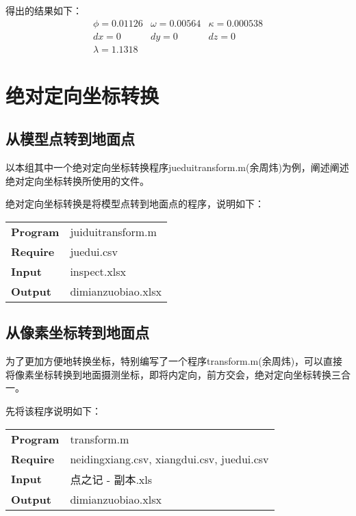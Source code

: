 得出的结果如下：
\begin{equation}
\begin{array}{lll}
\phi=0.01126 & \omega=0.00564 & \kappa=0.000538 \\
dx=0 & dy=0 & dz=0 \\
\lambda=1.1318 & &
\end{array}
\end{equation}

\section{绝对定向坐标转换}


\subsection{从模型点转到地面点}

以本组其中一个绝对定向坐标转换程序jueduitransform.m(余周炜)为例，阐述阐述绝对定向坐标转换所使用的文件。

绝对定向坐标转换是将模型点转到地面点的程序，说明如下：

\begin{table}[htbp]
  \begin{tabular}{p{10em}p{8cm}}
  \toprule
  \textbf{Program} & juiduitransform.m \\
  \textbf{Require} & juedui.csv \\
  \textbf{Input} & inspect.xlsx \\
  \textbf{Output} & dimianzuobiao.xlsx \\
  \bottomrule
  \end{tabular}
  \end{table}

\subsection{从像素坐标转到地面点}

为了更加方便地转换坐标，特别编写了一个程序transform.m(余周炜)，可以直接将像素坐标转换到地面摄测坐标，即将内定向，前方交会，绝对定向坐标转换三合一。

先将该程序说明如下：
\begin{table}[htbp]
\begin{tabular}{p{10em}p{8cm}}
\toprule
\textbf{Program} & transform.m \\
\textbf{Require} & neidingxiang.csv, xiangdui.csv, juedui.csv \\
\textbf{Input} & 点之记 - 副本.xls \\
\textbf{Output} & dimianzuobiao.xlsx \\
\bottomrule
\end{tabular}
\end{table}

